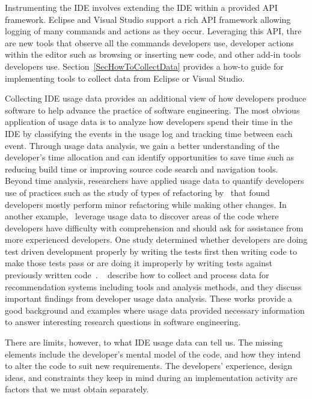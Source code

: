 \documentclass[authoryear]{elsarticle}
\begin{document}
Instrumenting the IDE involves extending the IDE within a provided API framework.  Eclipse and Visual Studio support a rich API framework allowing logging of many commands and actions as they occur.  Leveraging this API, thre are new tools that observe all the commands developers use, developer actions within the editor such as browsing or inserting new code, and other add-in tools developers use.  Section~\ref{SecHowToCollectData} provides a how-to guide for implementing tools to collect data from Eclipse or Visual Studio.  

Collecting IDE usage data provides an additional view of how developers produce software to help advance the practice of software engineering.  
The most obvious application of usage data is to analyze how developers spend their time in the IDE by classifying the events in the usage log and tracking time between each event.  Through usage data analysis, we gain a better understanding of the developer's time allocation and can identify opportunities to save time such as reducing build time or improving source code search and navigation tools.  Beyond time analysis, researchers have applied usage data to quantify developers use of practices such as the study of types of refactoring by~\citet{V:MurphyHill2012How} that found developers mostly perform minor refactoring while making other changes.  In another example,~\citet{Carter2010Are} leverage usage data to discover areas of the code where developers have difficulty with comprehension and should ask for assistance from more experienced developers.  One study determined whether developers are doing test driven development properly by writing the tests first then writing code to make those tests pass or are doing it improperly by writing tests against previously written code~\citep{Kou2010Operational}.  ~\citet{fritzBookChapter} describe how to collect and process data for recommendation systems including tools and analysis methods, and they discuss important findings from developer usage data analysis.    These works provide a good background and examples where usage data provided necessary information to answer interesting research questions in software engineering.

There are limits, however, to what IDE usage data can tell us.  The missing elements include the developer's mental model of the code, and how they intend to alter the code to suit new requirements.  The developers' experience, design ideas, and constraints they keep in mind during an implementation activity are factors that we must obtain separately.  
\end{document}
